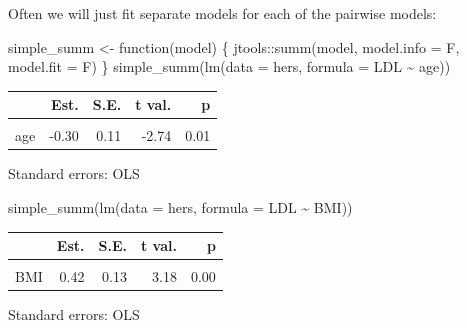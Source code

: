 \documentclass[
  letterpaper,
  DIV=11,
  numbers=noendperiod]{scrreport}
\newenvironment{Shaded}{\begin{snugshade}}{\end{snugshade}}
\newcommand{\AttributeTok}[1]{\textcolor[rgb]{0.40,0.45,0.13}{#1}}
\newcommand{\ControlFlowTok}[1]{\textcolor[rgb]{0.00,0.23,0.31}{#1}}
\newcommand{\FunctionTok}[1]{\textcolor[rgb]{0.28,0.35,0.67}{#1}}
\newcommand{\NormalTok}[1]{\textcolor[rgb]{0.00,0.23,0.31}{#1}}
\newcommand{\OtherTok}[1]{\textcolor[rgb]{0.00,0.23,0.31}{#1}}
\newcommand{\SpecialCharTok}[1]{\textcolor[rgb]{0.37,0.37,0.37}{#1}}
\begin{document}
Often we will just fit separate models for each of the pairwise models:

\begin{Shaded}
\begin{Highlighting}[]
\NormalTok{simple\_summ }\OtherTok{\textless{}{-}}
  \ControlFlowTok{function}\NormalTok{(model) \{}
\NormalTok{    jtools}\SpecialCharTok{::}\FunctionTok{summ}\NormalTok{(model, }\AttributeTok{model.info =}\NormalTok{ F, }\AttributeTok{model.fit =}\NormalTok{ F)}
\NormalTok{  \}}
\FunctionTok{simple\_summ}\NormalTok{(}\FunctionTok{lm}\NormalTok{(}\AttributeTok{data =}\NormalTok{ hers, }\AttributeTok{formula =}\NormalTok{ LDL }\SpecialCharTok{\textasciitilde{}}\NormalTok{ age))}
\end{Highlighting}
\end{Shaded}

\begin{table}[!h]
\centering
\begin{threeparttable}
\begin{tabular}{lrrrr}
\toprule
  & Est. & S.E. & t val. & p\\
\midrule
\cellcolor{gray!6}{(Intercept)} & \cellcolor{gray!6}{164.83} & \cellcolor{gray!6}{7.25} & \cellcolor{gray!6}{22.73} & \cellcolor{gray!6}{0.00}\\
age & -0.30 & 0.11 & -2.74 & 0.01\\
\bottomrule
\end{tabular}
\begin{tablenotes}
\item Standard errors: OLS
\end{tablenotes}
\end{threeparttable}
\end{table}

\begin{Shaded}
\begin{Highlighting}[]
\FunctionTok{simple\_summ}\NormalTok{(}\FunctionTok{lm}\NormalTok{(}\AttributeTok{data =}\NormalTok{ hers, }\AttributeTok{formula =}\NormalTok{ LDL }\SpecialCharTok{\textasciitilde{}}\NormalTok{ BMI))}
\end{Highlighting}
\end{Shaded}

\begin{table}[!h]
\centering
\begin{threeparttable}
\begin{tabular}{lrrrr}
\toprule
  & Est. & S.E. & t val. & p\\
\midrule
\cellcolor{gray!6}{(Intercept)} & \cellcolor{gray!6}{133.19} & \cellcolor{gray!6}{3.79} & \cellcolor{gray!6}{35.11} & \cellcolor{gray!6}{0.00}\\
BMI & 0.42 & 0.13 & 3.18 & 0.00\\
\bottomrule
\end{tabular}
\begin{tablenotes}
\item Standard errors: OLS
\end{tablenotes}
\end{threeparttable}
\end{table}
\end{document}
